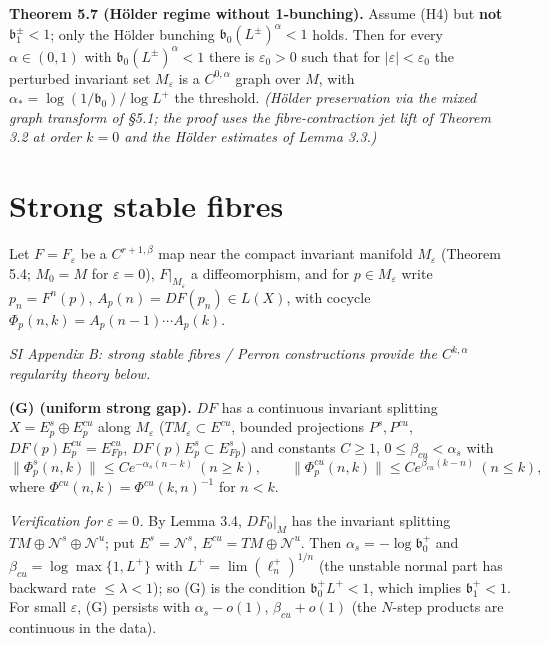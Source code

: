 \documentclass[11pt,a4paper]{article}
\theoremstyle{plain}
\theoremstyle{definition}
\theoremstyle{remark}
\numberwithin{equation}{section}
\numberwithin{figure}{section}
\begin{document}
\textbf{Theorem 5.7 (Hölder regime without 1-bunching).} Assume (H4) but \textbf{not} $\mathfrak b_1^\pm<1$; only the Hölder bunching $\mathfrak b_0(L^\pm)^\alpha<1$ holds. Then for every $\alpha\in(0,1)$ with $\mathfrak b_0(L^\pm)^\alpha<1$ there is $\varepsilon_0>0$ such that for $|\varepsilon|<\varepsilon_0$ the perturbed invariant set $M_\varepsilon$ is a $C^{0,\alpha}$ graph over $M$, with $\alpha_*=\log(1/\mathfrak b_0)/\log L^+$ the threshold. \textit{(Hölder preservation via the mixed graph transform of §5.1; the proof uses the fibre-contraction jet lift of Theorem 3.2 at order $k=0$ and the Hölder estimates of Lemma 3.3.)}

\section{Strong stable fibres}

Let $F=F_\varepsilon$ be a $C^{r+1,\beta}$ map near the compact invariant manifold $M_\varepsilon$ (Theorem 5.4; $M_0=M$ for $\varepsilon=0$), $F|_{M_\varepsilon}$ a diffeomorphism, and for $p\in M_\varepsilon$ write $p_n=F^n(p)$, $A_p(n)=DF(p_n)\in L(X)$, with cocycle $\Phi_p(n,k)=A_p(n-1)\cdots A_p(k)$.

\textit{SI Appendix B: strong stable fibres / Perron constructions provide the $C^{k,\alpha}$ regularity theory below.}

\textbf{(G) (uniform strong gap).} $DF$ has a continuous invariant splitting $X=E^s_p\oplus E^{cu}_p$ along $M_\varepsilon$ ($TM_\varepsilon\subset E^{cu}$, bounded projections $P^s,P^{cu}$, $DF(p)E^{cu}_p=E^{cu}_{Fp}$, $DF(p)E^s_p\subset E^s_{Fp}$) and constants $C\ge1$, $0\le\beta_{cu}<\alpha_s$ with
\[
\|\Phi^s_p(n,k)\|\le Ce^{-\alpha_s(n-k)}\ (n\ge k),\qquad\|\Phi^{cu}_p(n,k)\|\le Ce^{\beta_{cu}(k-n)}\ (n\le k),
\]
where $\Phi^{cu}(n,k)=\Phi^{cu}(k,n)^{-1}$ for $n<k$.

\textit{Verification for $\varepsilon=0$.} By Lemma 3.4, $DF_0|_M$ has the invariant splitting $TM\oplus\mathcal N^s\oplus\mathcal N^u$; put $E^s=\mathcal N^s$, $E^{cu}=TM\oplus\mathcal N^u$. Then $\alpha_s=-\log\mathfrak b_0^+$ and $\beta_{cu}=\log\max\{1,L^+\}$ with $L^+=\lim(\ell_n^+)^{1/n}$ (the unstable normal part has backward rate $\le\lambda<1$); so (G) is the condition $\mathfrak b_0^+L^+<1$, which implies $\mathfrak b_1^+<1$. For small $\varepsilon$, (G) persists with $\alpha_s-o(1)$, $\beta_{cu}+o(1)$ (the $N$-step products are continuous in the data).
\end{document}
